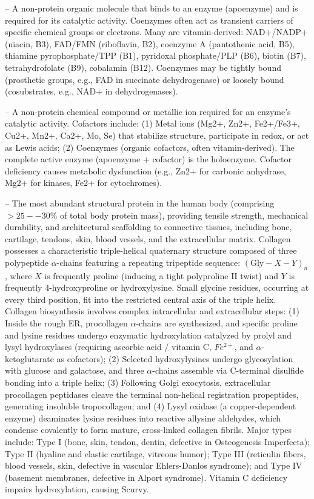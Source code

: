 -- A non-protein organic molecule that binds to an enzyme (apoenzyme) and is required for its catalytic activity. Coenzymes often act as transient carriers of specific chemical groups or electrons. Many are vitamin-derived: NAD+/NADP+ (niacin, B3), FAD/FMN (riboflavin, B2), coenzyme A (pantothenic acid, B5), thiamine pyrophosphate/TPP (B1), pyridoxal phosphate/PLP (B6), biotin (B7), tetrahydrofolate (B9), cobalamin (B12). Coenzymes may be tightly bound (prosthetic groups, e.g., FAD in succinate dehydrogenase) or loosely bound (cosubstrates, e.g., NAD+ in dehydrogenases).

-- A non-protein chemical compound or metallic ion required for an enzyme's catalytic activity. Cofactors include: (1) Metal ions (Mg2+, Zn2+, Fe2+/Fe3+, Cu2+, Mn2+, Ca2+, Mo, Se) that stabilize structure, participate in redox, or act as Lewis acids; (2) Coenzymes (organic cofactors, often vitamin-derived). The complete active enzyme (apoenzyme + cofactor) is the holoenzyme. Cofactor deficiency causes metabolic dysfunction (e.g., Zn2+ for carbonic anhydrase, Mg2+ for kinases, Fe2+ for cytochromes).

-- The most abundant structural protein in the human body (comprising $>25--30\%$ of total body protein mass), providing tensile strength, mechanical durability, and architectural scaffolding to connective tissues, including bone, cartilage, tendons, skin, blood vessels, and the extracellular matrix. Collagen possesses a characteristic triple-helical quaternary structure composed of three polypeptide $\alpha$-chains featuring a repeating tripeptide sequence: $(\text{Gly}-X-Y)_n$, where $X$ is frequently proline (inducing a tight polyproline II twist) and $Y$ is frequently 4-hydroxyproline or hydroxylysine. Small glycine residues, occurring at every third position, fit into the restricted central axis of the triple helix. Collagen biosynthesis involves complex intracellular and extracellular steps: (1) Inside the rough ER, procollagen $\alpha$-chains are synthesized, and specific proline and lysine residues undergo enzymatic hydroxylation catalyzed by prolyl and lysyl hydroxylases (requiring ascorbic acid / vitamin C, $Fe^{2+}$, and $\alpha$-ketoglutarate as cofactors); (2) Selected hydroxylysines undergo glycosylation with glucose and galactose, and three $\alpha$-chains assemble via C-terminal disulfide bonding into a triple helix; (3) Following Golgi exocytosis, extracellular procollagen peptidases cleave the terminal non-helical registration propeptides, generating insoluble tropocollagen; and (4) Lysyl oxidase (a copper-dependent enzyme) deaminates lysine residues into reactive allysine aldehydes, which condense covalently to form mature, cross-linked collagen fibrils. Major types include: Type I (bone, skin, tendon, dentin, defective in Osteogenesis Imperfecta); Type II (hyaline and elastic cartilage, vitreous humor); Type III (reticulin fibers, blood vessels, skin, defective in vascular Ehlers-Danlos syndrome); and Type IV (basement membranes, defective in Alport syndrome). Vitamin C deficiency impairs hydroxylation, causing Scurvy.

